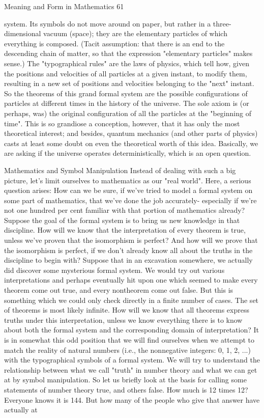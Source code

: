 Meaning and Form in Mathematics                                                           61

system. Its symbols do not move around on paper, but rather in a three-dimensional
vacuum (space); they are the elementary particles of which everything is composed.
(Tacit assumption: that there is an end to the descending chain of matter, so that the
expression "elementary particles" makes sense.) The "typographical rules" are the laws of
physics, which tell how, given the positions and velocities of all particles at a given
instant, to modify them, resulting in a new set of positions and velocities belonging to the
"next" instant. So the theorems of this grand formal system are the possible
configurations of particles at different times in the history of the universe. The sole axiom
is (or perhaps, was) the original configuration of all the particles at the "beginning of
time". This is so grandiose a conception, however, that it has only the most theoretical
interest; and besides, quantum mechanics (and other parts of physics) casts at least some
doubt on even the theoretical worth of this idea. Basically, we are asking if the universe
operates deterministically, which is an open question.

                        Mathematics and Symbol Manipulation
         Instead of dealing with such a big picture, let's limit ourselves to mathematics as
our "real world". Here, a serious question arises: How can we be sure, if we've tried to
model a formal system on some part of mathematics, that we've done the job accurately-
especially if we're not one hundred per cent familiar with that portion of mathematics
already? Suppose the goal of the formal system is to bring us new knowledge in that
discipline. How will we know that the interpretation of every theorem is true, unless
we've proven that the isomorphism is perfect? And how will we prove that the
isomorphism is perfect, if we don't already know all about the truths in the discipline to
begin with?
         Suppose that in an excavation somewhere, we actually did discover some
mysterious formal system. We would try out various interpretations and perhaps
eventually hit upon one which seemed to make every theorem come out true, and every
nontheorem come out false. But this is something which we could only check directly in
a finite number of cases. The set of theorems is most likely infinite. How will we know
that all theorems express truths under this interpretation, unless we know everything there
is to know about both the formal system and the corresponding domain of interpretation?
         It is in somewhat this odd position that we will find ourselves when we attempt to
match the reality of natural numbers (i.e., the nonnegative integers: 0, 1, 2, ...) with the
typographical symbols of a formal system. We will try to understand the relationship
between what we call "truth" in number theory and what we can get at by symbol
manipulation.
         So let us briefly look at the basis for calling some statements of number theory
true, and others false. How much is 12 times 12? Everyone knows it is 144. But how
many of the people who give that answer have actually at




